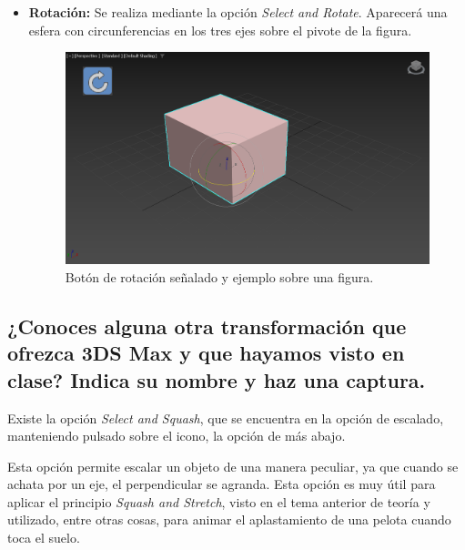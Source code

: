 \documentclass{article}
\begin{document}
\begin{itemize}
    \item \textbf{Rotación: }Se realiza mediante la opción \textit{Select and Rotate}. Aparecerá una esfera con circunferencias en los tres ejes sobre el pivote de la figura.
    
    \begin{figure}[H]
        \centering
        \includegraphics[width=\textwidth]{imagenes/rot.png}
        \caption{Botón de rotación señalado y ejemplo sobre una figura.}
     \end{figure}    
\end{itemize}

\subsection{¿Conoces alguna otra transformación que ofrezca 3DS Max y que hayamos visto en clase? Indica su nombre y haz una captura.}

Existe la opción \textit{Select and Squash}, que se encuentra en la opción de escalado, manteniendo pulsado sobre el icono, la opción de más abajo.

\bigskip

Esta opción permite escalar un objeto de una manera peculiar, ya que cuando se achata por un eje, el perpendicular se agranda. Esta opción es muy útil para aplicar el principio \textit{Squash and Stretch}, visto en el tema anterior de teoría y utilizado, entre otras cosas, para animar el aplastamiento de una pelota cuando toca el suelo.
\end{document}

